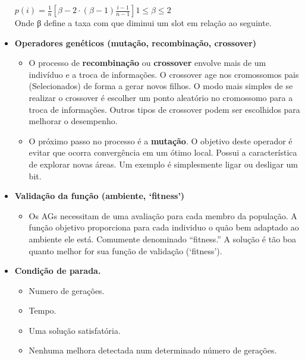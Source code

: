 \documentclass[12pt]{article}
\providecommand{\tightlist}{%
\setlength{\itemsep}{0pt}\setlength{\parskip}{0pt}}
\begin{document}
\begin{itemize}
  \(p(i) = \frac{1}{n} \left[\beta-2 \cdot (\beta-1) \frac{i-1}{n-1} \right] 1 \leq \beta \leq 2\) \\

  Onde β define a taxa com que diminui um slot em relação ao seguinte. \\
\item
  \textbf{Operadores genéticos (mutação, recombinação, crossover)}

  \begin{itemize}
  \item
    O processo de \textbf{recombinação} ou \textbf{crossover} envolve
    mais de um indivíduo e a troca de informações. O crossover age nos
    cromossomos pais (Selecionados) de forma a gerar novos filhos. O
    modo mais simples de se realizar o crossover é escolher um ponto
    aleatório no cromossomo para a troca de informações. Outros tipos de
    crossover podem ser escolhidos para melhorar o desempenho.
  \item
    O próximo passo no processo é a \textbf{mutação}. O objetivo deste
    operador é evitar que ocorra convergência em um ótimo local. Possui
    a característica de explorar novas áreas. Um exemplo é simplesmente
    ligar ou desligar um bit.
  \end{itemize}
\item
  \textbf{Validação da função (ambiente, `fitness')}

  \begin{itemize}
  \tightlist
  \item
    Os AGs necessitam de uma avaliação para cada membro da população. A
    função objetivo proporciona para cada individuo o quão bem adaptado
    ao ambiente ele está. Comumente denominado ``fitness.'' A solução é
    tão boa quanto melhor for sua função de validação (`fitness').
  \end{itemize}
\item
  \textbf{Condição de parada.}

  \begin{itemize}
  \tightlist
  \item
    Numero de gerações.
  \item
    Tempo.
  \item
    Uma solução satisfatória.
  \item
    Nenhuma melhora detectada num determinado número de gerações.
  \end{itemize}
\end{itemize}
\end{document}
